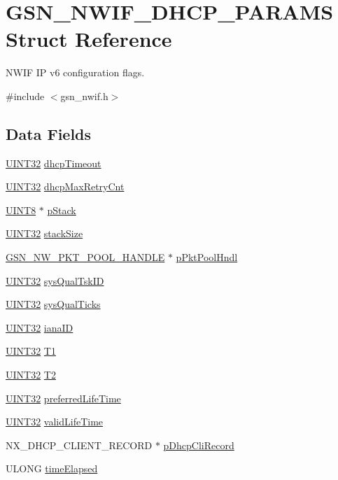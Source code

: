 \hypertarget{a00168}{
\section{GSN\_\-NWIF\_\-DHCP\_\-PARAMS Struct Reference}
\label{a00168}
}


NWIF IP v6 configuration flags.  




{\ttfamily \#include $<$gsn\_\-nwif.h$>$}

\subsection*{Data Fields}
\begin{DoxyCompactItemize}
\item 
\hyperlink{a00660_gae1e6edbbc26d6fbc71a90190d0266018}{UINT32} \hyperlink{a00168_a3be33cc128077b2e16f822c8415f10dc}{dhcpTimeout}
\item 
\hyperlink{a00660_gae1e6edbbc26d6fbc71a90190d0266018}{UINT32} \hyperlink{a00168_adfe6154e4e0eb3a2a020a6473fd9ef28}{dhcpMaxRetryCnt}
\item 
\hyperlink{a00660_gab27e9918b538ce9d8ca692479b375b6a}{UINT8} $\ast$ \hyperlink{a00168_ad576950ba372f7a10189812ba4e2de3a}{pStack}
\item 
\hyperlink{a00660_gae1e6edbbc26d6fbc71a90190d0266018}{UINT32} \hyperlink{a00168_a82cabdcaee43fc729a1da5551d429f73}{stackSize}
\item 
\hyperlink{a00532_afccc5835aa5e2916600678de68186848}{GSN\_\-NW\_\-PKT\_\-POOL\_\-HANDLE} $\ast$ \hyperlink{a00168_a4dd138b425ca3a4d78a87043bc7e8029}{pPktPoolHndl}
\item 
\hyperlink{a00660_gae1e6edbbc26d6fbc71a90190d0266018}{UINT32} \hyperlink{a00168_a3e06cb8fa58f49b7004a85c6f387ddc7}{sysQualTskID}
\item 
\hyperlink{a00660_gae1e6edbbc26d6fbc71a90190d0266018}{UINT32} \hyperlink{a00168_a3b8eb219c70a5f7fc6dcb9d9643cbc31}{sysQualTicks}
\item 
\hyperlink{a00660_gae1e6edbbc26d6fbc71a90190d0266018}{UINT32} \hyperlink{a00168_a533aa31f7aca04d55df9377af78e48eb}{ianaID}
\item 
\hyperlink{a00660_gae1e6edbbc26d6fbc71a90190d0266018}{UINT32} \hyperlink{a00168_abddb72aaa9095129e618bd0621412ab3}{T1}
\item 
\hyperlink{a00660_gae1e6edbbc26d6fbc71a90190d0266018}{UINT32} \hyperlink{a00168_ae2a551175ad9eef4bcf84ee25773c78b}{T2}
\item 
\hyperlink{a00660_gae1e6edbbc26d6fbc71a90190d0266018}{UINT32} \hyperlink{a00168_adc053e52c63bf49419525d7c9a089aea}{preferredLifeTime}
\item 
\hyperlink{a00660_gae1e6edbbc26d6fbc71a90190d0266018}{UINT32} \hyperlink{a00168_aa87f9d507d75c14447e994bd1503d42b}{validLifeTime}
\item 
NX\_\-DHCP\_\-CLIENT\_\-RECORD $\ast$ \hyperlink{a00168_a1c88ca9d05b135f0b9c642340acd8861}{pDhcpCliRecord}
\item 
ULONG \hyperlink{a00168_a442b8bcc5191ff5752ea8bf38230e4da}{timeElapsed}
\end{DoxyCompactItemize}


